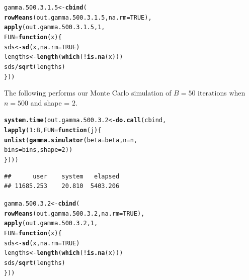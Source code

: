 \documentclass[11pt]{article}\usepackage[]{graphicx}\usepackage[]{color}
\makeatletter
\newcommand{\hlnum}[1]{\textcolor[rgb]{0.686,0.059,0.569}{#1}}%
\newcommand{\hlopt}[1]{\textcolor[rgb]{0,0,0}{#1}}%
\newcommand{\hlstd}[1]{\textcolor[rgb]{0.345,0.345,0.345}{#1}}%
\newcommand{\hlkwa}[1]{\textcolor[rgb]{0.161,0.373,0.58}{\textbf{#1}}}%
\newcommand{\hlkwb}[1]{\textcolor[rgb]{0.69,0.353,0.396}{#1}}%
\newcommand{\hlkwc}[1]{\textcolor[rgb]{0.333,0.667,0.333}{#1}}%
\newcommand{\hlkwd}[1]{\textcolor[rgb]{0.737,0.353,0.396}{\textbf{#1}}}%
\newenvironment{kframe}{%
 \def\at@end@of@kframe{}%
 \ifinner\ifhmode%
  \def\at@end@of@kframe{\end{minipage}}%
  \begin{minipage}{\columnwidth}%
 \fi\fi%
 \def\FrameCommand##1{\hskip\@totalleftmargin \hskip-\fboxsep
 \colorbox{shadecolor}{##1}\hskip-\fboxsep
     \hskip-\linewidth \hskip-\@totalleftmargin \hskip\columnwidth}%
 \MakeFramed {\advance\hsize-\width
   \@totalleftmargin\z@ \linewidth\hsize
   \@setminipage}}%
 {\par\unskip\endMakeFramed%
 \at@end@of@kframe}
\newenvironment{knitrout}{}{} %
\makeatother
\begin{document}
\begin{knitrout}
\color{fgcolor}\begin{kframe}
\begin{alltt}
\hlstd{gamma.500.3.1.5} \hlkwb{<-} \hlkwd{cbind}\hlstd{(}
  \hlkwd{rowMeans}\hlstd{(out.gamma.500.3.1.5,} \hlkwc{na.rm} \hlstd{=} \hlnum{TRUE}\hlstd{),}
  \hlkwd{apply}\hlstd{(out.gamma.500.3.1.5,} \hlnum{1}\hlstd{,}
  \hlkwc{FUN} \hlstd{=} \hlkwa{function}\hlstd{(}\hlkwc{x}\hlstd{)\{}
    \hlstd{sds} \hlkwb{<-} \hlkwd{sd}\hlstd{(x,} \hlkwc{na.rm} \hlstd{=} \hlnum{TRUE}\hlstd{)}
    \hlstd{lengths} \hlkwb{<-} \hlkwd{length}\hlstd{(}\hlkwd{which}\hlstd{(}\hlopt{!}\hlkwd{is.na}\hlstd{(x)))}
    \hlstd{sds} \hlopt{/} \hlkwd{sqrt}\hlstd{(lengths)}
  \hlstd{\}))}
\end{alltt}
\end{kframe}
\end{knitrout}

The following performs our Monte Carlo simulation of $B = 50$ iterations 
when $n = 500$ and shape = $2$.

\begin{knitrout}
\color{fgcolor}\begin{kframe}
\begin{alltt}
\hlkwd{system.time}\hlstd{(out.gamma.500.3.2} \hlkwb{<-} \hlkwd{do.call}\hlstd{(cbind,}
  \hlkwd{lapply}\hlstd{(}\hlnum{1}\hlopt{:}\hlstd{B,} \hlkwc{FUN} \hlstd{=} \hlkwa{function}\hlstd{(}\hlkwc{j}\hlstd{)\{}
    \hlkwd{unlist}\hlstd{(}\hlkwd{gamma.simulator}\hlstd{(}\hlkwc{beta} \hlstd{= beta,} \hlkwc{n} \hlstd{= n,}
      \hlkwc{bins} \hlstd{= bins,} \hlkwc{shape} \hlstd{=} \hlnum{2}\hlstd{))}
\hlstd{\})))}
\end{alltt}
\begin{verbatim}
##      user    system   elapsed 
## 11685.253    20.810  5403.206
\end{verbatim}
\end{kframe}
\end{knitrout}

\begin{knitrout}
\color{fgcolor}\begin{kframe}
\begin{alltt}
\hlstd{gamma.500.3.2} \hlkwb{<-} \hlkwd{cbind}\hlstd{(}
  \hlkwd{rowMeans}\hlstd{(out.gamma.500.3.2,} \hlkwc{na.rm} \hlstd{=} \hlnum{TRUE}\hlstd{),}
  \hlkwd{apply}\hlstd{(out.gamma.500.3.2,} \hlnum{1}\hlstd{,}
  \hlkwc{FUN} \hlstd{=} \hlkwa{function}\hlstd{(}\hlkwc{x}\hlstd{)\{}
    \hlstd{sds} \hlkwb{<-} \hlkwd{sd}\hlstd{(x,} \hlkwc{na.rm} \hlstd{=} \hlnum{TRUE}\hlstd{)}
    \hlstd{lengths} \hlkwb{<-} \hlkwd{length}\hlstd{(}\hlkwd{which}\hlstd{(}\hlopt{!}\hlkwd{is.na}\hlstd{(x)))}
    \hlstd{sds} \hlopt{/} \hlkwd{sqrt}\hlstd{(lengths)}
  \hlstd{\}))}
\end{alltt}
\end{kframe}
\end{knitrout}
\end{document}
